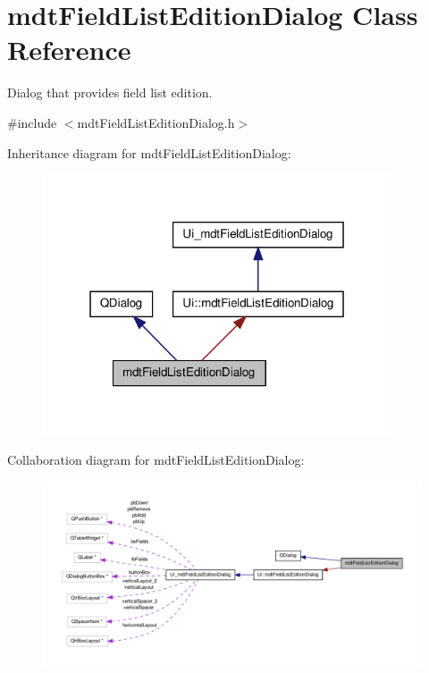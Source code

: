 \hypertarget{classmdt_field_list_edition_dialog}{\section{mdt\-Field\-List\-Edition\-Dialog Class Reference}
\label{classmdt_field_list_edition_dialog}
}


Dialog that provides field list edition.  




{\ttfamily \#include $<$mdt\-Field\-List\-Edition\-Dialog.\-h$>$}



Inheritance diagram for mdt\-Field\-List\-Edition\-Dialog\-:\nopagebreak
\begin{figure}[H]
\begin{center}
\leavevmode
\includegraphics[width=292pt]{classmdt_field_list_edition_dialog__inherit__graph}
\end{center}
\end{figure}


Collaboration diagram for mdt\-Field\-List\-Edition\-Dialog\-:\nopagebreak
\begin{figure}[H]
\begin{center}
\leavevmode
\includegraphics[width=350pt]{classmdt_field_list_edition_dialog__coll__graph}
\end{center}
\end{figure}
